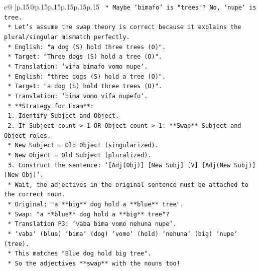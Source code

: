 \documentclass{article}
\begin{document}
{\begin{supertabular}{c@{$\;$}|p{.15\linewidth}@{}p{.15\linewidth}p{.15\linewidth}p{.15\linewidth}p{.15\linewidth}p{.15\linewidth}}
{{{\texttt{                *   Maybe `bimafo` is "trees"? No, `nupe` is tree.} \\
\texttt{                *   Let's assume the swap theory is correct because it explains the plural/singular mismatch perfectly.} \\
\texttt{                    *   English: "a dog (S) hold three trees (O)".} \\
\texttt{                    *   Target: "Three dogs (S) hold a tree (O)".} \\
\texttt{                    *   Translation: `vifa bimafo vomo nupe`.} \\
\texttt{                    *   English: "three dogs (S) hold a tree (O)".} \\
\texttt{                    *   Target: "a dog (S) hold three trees (O)".} \\
\texttt{                    *   Translation: `bima vomo vifa nupefo`.} \\
\texttt{            *   **Strategy for Exam**:} \\
\texttt{                1.  Identify Subject and Object.} \\
\texttt{                2.  If Subject count > 1 OR Object count > 1: **Swap** Subject and Object roles.} \\
\texttt{                    *   New Subject = Old Object (singularized).} \\
\texttt{                    *   New Object = Old Subject (pluralized).} \\
\texttt{                3.  Construct the sentence: `{[}Adj(Obj){]} {[}New Subj{]} {[}V{]} {[}Adj(New Subj){]} {[}New Obj{]}`.} \\
\texttt{                    *   Wait, the adjectives in the original sentence must be attached to the correct noun.} \\
\texttt{                    *   Original: "a **big** dog hold a **blue** tree".} \\
\texttt{                    *   Swap: "a **blue** dog hold a **big** tree"?} \\
\texttt{                    *   Translation P3: `vaba bima vomo nehuna nupe`.} \\
\texttt{                    *   `vaba` (blue) `bima` (dog) `vomo` (hold) `nehuna` (big) `nupe` (tree).} \\
\texttt{                    *   This matches "Blue dog hold big tree".} \\
\texttt{                    *   So the adjectives **swap** with the nouns too!} \\
}}}
\end{supertabular}}
\end{document}
